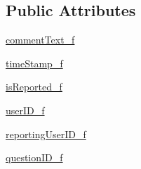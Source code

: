 \subsection*{Public Attributes}
\begin{DoxyCompactItemize}
\item 
\hyperlink{class_ecodena_1_1_comment_1_1models_1_1_comment_ad5b1fd7419be638d296dad50d7336798}{commentText\_\-f}
\item 
\hyperlink{class_ecodena_1_1_comment_1_1models_1_1_comment_a48f0a7161209f9fca70c75637384c6b6}{timeStamp\_\-f}
\item 
\hyperlink{class_ecodena_1_1_comment_1_1models_1_1_comment_aa690ec4009c2c1c783fdcd6d6ee29a6e}{isReported\_\-f}
\item 
\hyperlink{class_ecodena_1_1_comment_1_1models_1_1_comment_abe252b90b2a4fcb55b86fcdc12e9ddd5}{userID\_\-f}
\item 
\hyperlink{class_ecodena_1_1_comment_1_1models_1_1_comment_ad01a59e4f30cca2bde7b205e47091ffc}{reportingUserID\_\-f}
\item 
\hyperlink{class_ecodena_1_1_comment_1_1models_1_1_comment_a7185724458c06c0810da5aa79ddb222b}{questionID\_\-f}
\end{DoxyCompactItemize}
